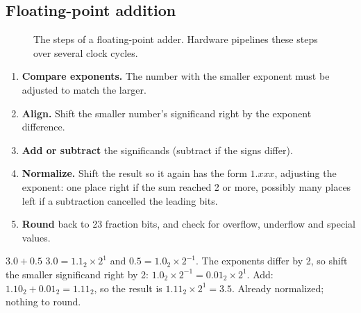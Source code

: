 \subsection*{Floating-point addition}

\begin{figure}[h]
\centering
{}
\caption{The steps of a floating-point adder. Hardware pipelines these steps over several clock cycles.}
\label{fig:fpadd}
\end{figure}

\begin{enumerate}
  \item \textbf{Compare exponents.} The number with the smaller exponent must be adjusted to match the larger.
  \item \textbf{Align.} Shift the smaller number's significand right by the exponent difference.
  \item \textbf{Add or subtract} the significands (subtract if the signs differ).
  \item \textbf{Normalize.} Shift the result so it again has the form $1.xxx$, adjusting the exponent: one place right if the sum reached 2 or more, possibly many places left if a subtraction cancelled the leading bits.
  \item \textbf{Round} back to 23 fraction bits, and check for overflow, underflow and special values.
\end{enumerate}

\begin{worked}{$3.0 + 0.5$}
$3.0 = 1.1_2 \times 2^1$ and $0.5 = 1.0_2 \times 2^{-1}$. The exponents differ by 2, so shift the smaller significand right by 2: $1.0_2 \times 2^{-1} = 0.01_2 \times 2^1$. Add: $1.10_2 + 0.01_2 = 1.11_2$, so the result is $1.11_2 \times 2^1 = 3.5$. Already normalized; nothing to round.
\end{worked}


